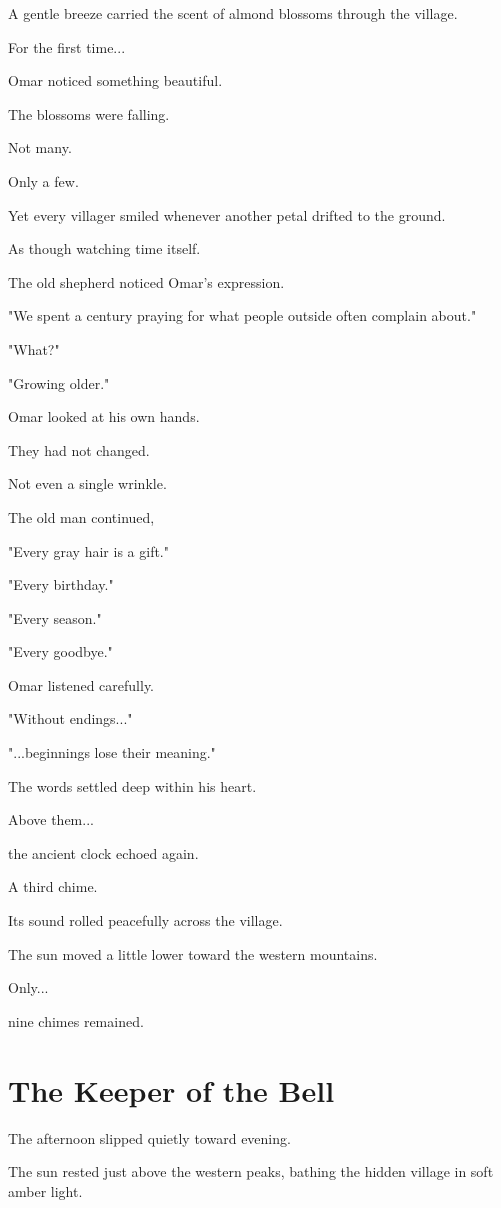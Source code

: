 \documentclass[12pt,openany]{book}
\begin{document}
A gentle breeze carried the scent of almond blossoms through the village.

For the first time...

Omar noticed something beautiful.

The blossoms were falling.

Not many.

Only a few.

Yet every villager smiled whenever another petal drifted to the ground.

As though watching time itself.

The old shepherd noticed Omar's expression.

"We spent a century praying for what people outside often complain about."

"What?"

"Growing older."

Omar looked at his own hands.

They had not changed.

Not even a single wrinkle.

The old man continued,

"Every gray hair is a gift."

"Every birthday."

"Every season."

"Every goodbye."

Omar listened carefully.

"Without endings..."

"...beginnings lose their meaning."

The words settled deep within his heart.

Above them...

the ancient clock echoed again.

A third chime.

Its sound rolled peacefully across the village.

The sun moved a little lower toward the western mountains.

Only...

nine chimes remained.
\section*{The Keeper of the Bell}

The afternoon slipped quietly toward evening.

The sun rested just above the western peaks, bathing the hidden village in soft amber light.
\end{document}
